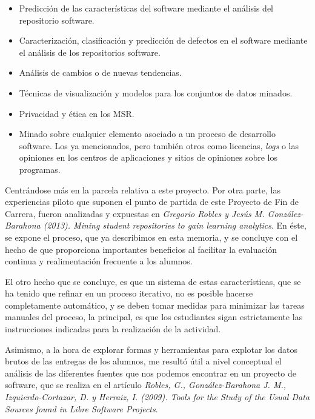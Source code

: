 \begin{itemize}
\item Predicción de las características del software mediante el análisis del repositorio software.

\item Caracterización, clasificación y predicción de defectos en el software mediante el análisis de los repositorios software.

\item Análisis de cambios o de nuevas tendencias.

\item Técnicas de visualización y modelos para los conjuntos de datos minados.

\item Privacidad y ética en los MSR.

\item Minado sobre cualquier elemento asociado a un proceso de desarrollo software. Los ya mencionados, pero también otros como licencias, \textit{logs} o las opiniones en los centros de aplicaciones y sitios de opiniones sobre los programas.
\end{itemize}


Centrándose más en la parcela relativa a este proyecto. Por otra parte, las experiencias piloto que suponen el punto de partida de este Proyecto de Fin de Carrera, fueron analizadas y expuestas en \textit{Gregorio Robles y Jesús M. González-Barahona (2013). Mining student repositories to gain learning analytics}. En éste, se expone el proceso, que ya describimos en esta memoria, y se concluye con el hecho de que proporciona importantes beneficios al facilitar la evaluación continua y realimentación frecuente a los alumnos.


El otro hecho que se concluye, es que un sistema de estas características, que se ha tenido que refinar en un proceso iterativo, no es posible hacerse completamente automático, y se deben tomar medidas para minimizar las tareas manuales del proceso, la principal, es que los estudiantes sigan estrictamente las instrucciones indicadas para la realización de la actividad.


Asimismo, a la hora de explorar formas y herramientas para explotar los datos brutos de las entregas de los alumnos, me resultó útil a nivel conceptual el análisis de las diferentes fuentes que nos podemos encontrar en un proyecto de software, que se realiza en el artículo \textit{Robles, G., González-Barahona J. M., Izquierdo-Cortazar, D. y Herraiz, I. (2009). Tools for the Study of the Usual Data Sources found in Libre Software Projects}.


